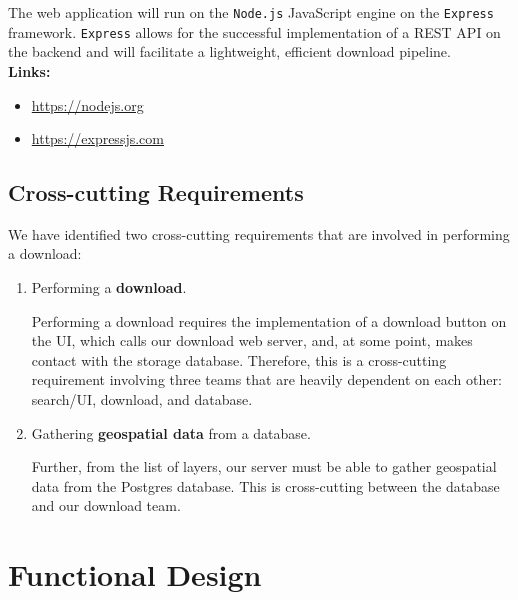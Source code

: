 \documentclass{article}
\begin{document}
	The web application will run on the \texttt{Node.js} JavaScript engine on the \texttt{Express} framework. \texttt{Express} allows for the successful implementation of a REST API on the backend and will facilitate a lightweight, efficient download pipeline. \\
	
	\textbf{Links:}
	\begin{itemize} 
		\item \url{https://nodejs.org}
		\item \url{https://expressjs.com}
	\end{itemize}
	
	\clearpage
	
	\subsection{Cross-cutting Requirements}
	
	We have identified two cross-cutting requirements that are involved in performing a download: 
	
	\begin{enumerate}
	\item Performing a \textbf{download}.
	
	Performing a download requires the implementation of a download button on the UI, which calls our download web server, and, at some point, makes contact with the storage database. Therefore, this is a cross-cutting requirement involving three teams that are heavily dependent on each other: search/UI, download, and database. \\
	
	\item Gathering \textbf{geospatial data} from a database.
	
	Further, from the list of layers, our server must be able to gather geospatial data from the Postgres database. This is cross-cutting between the database and our download team.
	
	\end{enumerate}
	
	\clearpage
	
	\section{Functional Design}
	
\end{document}
